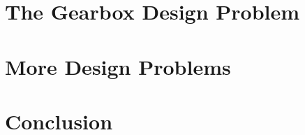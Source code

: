 \documentclass[a4paper,12pt]{report}
\begin{document}
\chapter{The Gearbox Design Problem}


\chapter{More Design Problems}


\chapter{Conclusion}



% 

  
\newpage
{}
\begin{spacing}{1.5}
\nocite{*}
 
%

\end{spacing}
 

\end{document}
